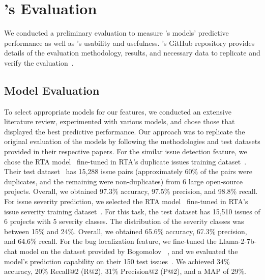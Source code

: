 

\section{\toolname's Evaluation}
We conducted a preliminary evaluation to measure \toolname's models' predictive performance as well as \toolname's usability and usefulness. \toolname's GitHub repository provides details of the evaluation methodology, results, and necessary data to replicate and verify the evaluation~\cite{repl_pack}. 

\subsection{Model Evaluation}
To select appropriate models for our features, we conducted an extensive literature review, experimented with various models, and chose those that displayed the best predictive performance. Our approach was to replicate the original evaluation of the models by following the methodologies and test datasets provided in their respective papers. For the similar issue detection feature, we chose the RTA model~\cite{fang2023representthemall} fine-tuned in RTA's duplicate issues training dataset~\cite{representThemAllDataset}. Their test dataset~\cite{representThemAllDataset} has 15,288 issue pairs (approximately 60\% of the pairs were duplicates, and the remaining were non-duplicates) from 6 large open-source projects. Overall, we obtained 97.3\% accuracy, 97.5\% precision, and 98.8\% recall. For issue severity prediction, we selected the RTA model~\cite{fang2023representthemall} fine-tuned in RTA's issue severity training dataset~\cite{representThemAllDataset}. For this task, the test dataset has 15,510 issues of 6 projects with 5 severity classes. The distribution of the severity classes was between 15\% and 24\%.  Overall, we obtained 65.6\% accuracy, 67.3\% precision, and 64.6\% recall. For the bug localization feature, we fine-tuned the Llama-2-7b-chat model on the dataset provided by Bogomolov \etal~\cite{longCodeArena}, and we evaluated the model’s prediction capability on their 150 test issues~\cite{longCodeBLDataset}. We achieved 34\% accuracy, 20\% Recall@2 (R@2), 31\% Precision@2 (P@2), and a MAP of 29\%. 

